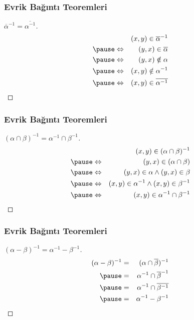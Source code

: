 \documentclass[dvipsnames]{beamer}
\theoremstyle{definition}
\theoremstyle{example}
\theoremstyle{plain}
\begin{document}
\begin{frame}
  \frametitle{Evrik Bağıntı Teoremleri}

  \begin{proof}[$\overline{\alpha}^{-1} = \overline{\alpha^{-1}}$]
    \begin{eqnarray*}
      &                 & (x,y) \in \overline{\alpha}^{-1}\\\pause
      & \Leftrightarrow & (y,x) \in \overline{\alpha}\\\pause
      & \Leftrightarrow & (y,x) \notin \alpha\\\pause
      & \Leftrightarrow & (x,y) \notin \alpha^{-1}\\\pause
      & \Leftrightarrow & (x,y) \in \overline{\alpha^{-1}}
    \end{eqnarray*}
  \end{proof}
\end{frame}

\begin{frame}
  \frametitle{Evrik Bağıntı Teoremleri}

  \begin{proof}[$(\alpha \cap \beta)^{-1} = \alpha^{-1} \cap \beta^{-1}$]
    \begin{eqnarray*}
      &                 & (x,y) \in (\alpha \cap \beta)^{-1}\\\pause
      & \Leftrightarrow & (y,x) \in (\alpha \cap \beta)\\\pause
      & \Leftrightarrow & (y,x) \in \alpha \wedge (y,x) \in \beta\\\pause
      & \Leftrightarrow & (x,y) \in \alpha^{-1}
                   \wedge (x,y) \in \beta^{-1}\\\pause
      & \Leftrightarrow & (x,y) \in \alpha^{-1} \cap \beta^{-1}
    \end{eqnarray*}
  \end{proof}
\end{frame}

\begin{frame}
  \frametitle{Evrik Bağıntı Teoremleri}

  \begin{proof}[$(\alpha - \beta)^{-1} = \alpha^{-1} - \beta^{-1}$]
    \begin{eqnarray*}
      (\alpha - \beta)^{-1} & = & (\alpha \cap \overline{\beta})^{-1}\\\pause
                            & = & \alpha^{-1} \cap \overline{\beta}^{-1}\\\pause
                            & = & \alpha^{-1} \cap \overline{\beta^{-1}}\\\pause
                            & = & \alpha^{-1} - \beta^{-1}
    \end{eqnarray*}
  \end{proof}
\end{frame}
\end{document}
